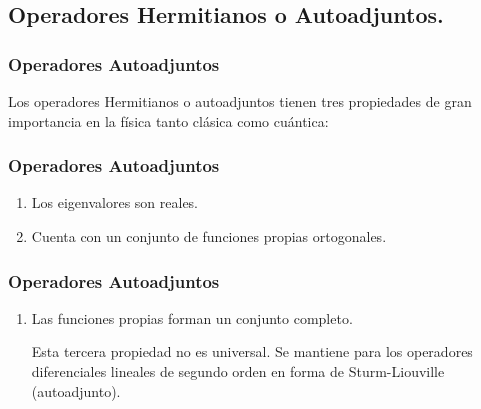 \documentclass[12pt]{beamer}
\begin{document}
\subsection{Operadores Hermitianos o Autoadjuntos.}

\begin{frame}
\frametitle{Operadores Autoadjuntos}
Los operadores Hermitianos o autoadjuntos tienen tres propiedades de gran importancia en la física tanto clásica como cuántica:
\end{frame}
\begin{frame}
\frametitle{Operadores Autoadjuntos}
\begin{enumerate}[<+->]
\item Los eigenvalores son reales.
\item Cuenta con un conjunto de funciones propias ortogonales.
\seti
\end{enumerate}
\end{frame}
\begin{frame}
\frametitle{Operadores Autoadjuntos}
\begin{enumerate}[<+->]
\conti
\item Las funciones propias forman un conjunto completo.
\par
Esta tercera propiedad no es universal. Se mantiene para los operadores diferenciales lineales de segundo orden en forma de Sturm-Liouville (autoadjunto).
\end{enumerate}
\end{frame}
\end{document}
